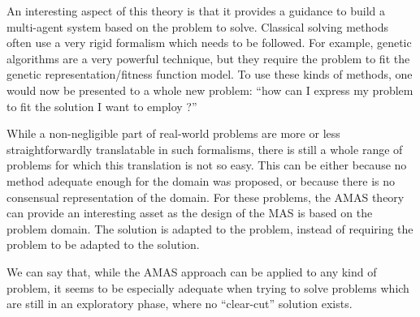 An interesting aspect of this theory  is that it provides a guidance to build a multi-agent system based on the problem to solve. Classical solving methods often use a very rigid formalism which needs to be followed. For example, genetic algorithms are a very powerful technique, but they require the problem to fit the genetic representation/fitness function model. To use these kinds of methods, one would now be presented to a whole new problem: \enquote{how can I express my problem to fit the solution I want to employ ?}

While a non-negligible part of real-world problems are more or less straightforwardly translatable in such formalisms, there is still a whole range of problems for which this translation is not so easy. This can be either because no method adequate enough for the domain was proposed, or because there is no consensual representation of the domain. For these problems, the AMAS theory can provide an interesting asset as the design of the MAS is based on the problem domain. The solution is adapted to the problem, instead of requiring the problem to be adapted to the solution.

We can say that, while the AMAS approach can be applied to any kind of problem, it seems to be especially adequate when trying to solve problems which are still in an exploratory phase, where no \enquote{clear-cut} solution exists.


